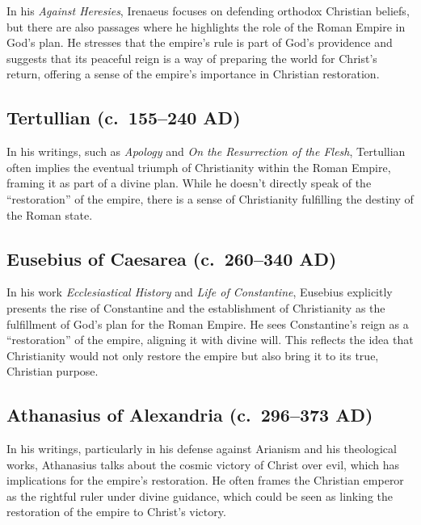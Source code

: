 In his \emph{Against Heresies}, Irenaeus focuses on defending orthodox Christian beliefs, but there are also passages where he highlights the role of the Roman Empire in God's plan.
He stresses that the empire's rule is part of God's providence and suggests that its peaceful reign is a way of preparing the world for Christ's return, offering a sense of the empire's importance in Christian restoration.

\subsection{Tertullian (c.~155--240 AD)}\label{par:tertullian-c.-155240-ad---in-his-writings-such-as-apology-and-on-the-resurrection-of-the-flesh-tertullian-often-implies-the-eventual-triumph-of-christianity-within-the-roman-empire-framing-it-as-part-of-a-divine-plan.-while-he-doesnt-directly-speak-of-the-restoration-of-the-empire-there-is-a-sense-of-christianity-fulfilling-the-destiny-of-the-roman-state.}

In his writings, such as \emph{Apology} and \emph{On the Resurrection of the Flesh}, Tertullian often implies the eventual triumph of Christianity within the Roman Empire, framing it as part of a divine plan.
While he doesn't directly speak of the ``restoration'' of the empire, there is a sense of Christianity fulfilling the destiny of the Roman state.

\subsection{Eusebius of Caesarea (c.~260--340 AD)}\label{par:eusebius-of-caesarea-c.-260340-ad}

In his work \emph{Ecclesiastical History} and \emph{Life of Constantine}, Eusebius explicitly presents the rise of Constantine and the establishment of Christianity as the fulfillment of God's plan for the Roman Empire.
He sees Constantine's reign as a ``restoration'' of the empire, aligning it with divine will.
This reflects the idea that Christianity would not only restore the empire but also bring it to its true, Christian purpose.

\subsection{Athanasius of Alexandria (c.~296--373 AD)}\label{par:athanasius-of-alexandria-c.-296373-ad}

In his writings, particularly in his defense against Arianism and his theological works, Athanasius talks about the cosmic victory of Christ over evil, which has implications for the empire's restoration.
He often frames the Christian emperor as the rightful ruler under divine guidance, which could be seen as linking the restoration of the empire to Christ's victory.

